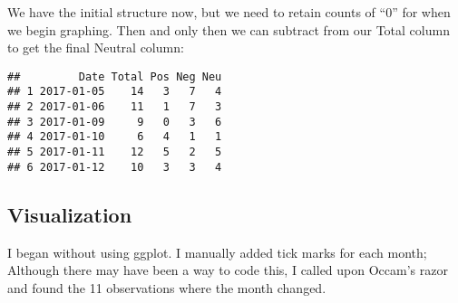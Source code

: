 \documentclass[]{article}
\newenvironment{Shaded}{\begin{snugshade}}{\end{snugshade}}
\newcommand{\KeywordTok}[1]{\textcolor[rgb]{0.13,0.29,0.53}{\textbf{#1}}}
\newcommand{\DecValTok}[1]{\textcolor[rgb]{0.00,0.00,0.81}{#1}}
\newcommand{\StringTok}[1]{\textcolor[rgb]{0.31,0.60,0.02}{#1}}
\newcommand{\OperatorTok}[1]{\textcolor[rgb]{0.81,0.36,0.00}{\textbf{#1}}}
\newcommand{\NormalTok}[1]{#1}
\begin{document}
We have the initial structure now, but we need to retain counts of ``0''
for when we begin graphing. Then and only then we can subtract from our
Total column to get the final Neutral column:

\begin{Shaded}
\end{Shaded}

\begin{verbatim}
##         Date Total Pos Neg Neu
## 1 2017-01-05    14   3   7   4
## 2 2017-01-06    11   1   7   3
## 3 2017-01-09     9   0   3   6
## 4 2017-01-10     6   4   1   1
## 5 2017-01-11    12   5   2   5
## 6 2017-01-12    10   3   3   4
\end{verbatim}

\subsection{Visualization}\label{visualization}

I began without using ggplot. I manually added tick marks for each
month; Although there may have been a way to code this, I called upon
Occam's razor and found the 11 observations where the month changed.
\end{document}
